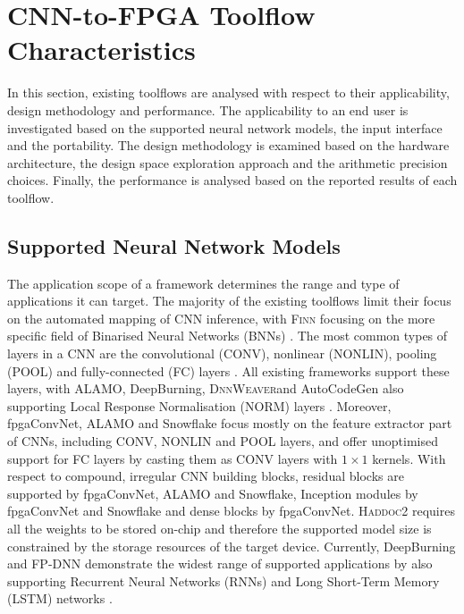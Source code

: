 \documentclass[format=acmsmall, review=false, screen=true]{acmart}
\begin{document}
\section{CNN-to-FPGA Toolflow Characteristics}\label{sec2}

In this section, existing toolflows are analysed with respect to their applicability, design methodology and performance. The applicability to an end user is investigated based on the supported neural network models, the input interface and the portability. The design methodology is examined based on the hardware architecture, the design space exploration approach and the arithmetic precision choices. Finally, the performance is analysed based on the reported results of each toolflow.

\subsection{Supported Neural Network Models}\label{sec3}
The application scope of a framework determines the range and type of applications it can target. The majority of the existing toolflows limit their focus on the automated mapping of CNN inference, with
\textsc{Finn} focusing on the more specific field of Binarised Neural Networks (BNNs) \cite{NIPS2016_bnns}. The most common types of layers in a CNN are the convolutional (CONV), nonlinear (NONLIN), pooling (POOL) and fully-connected (FC) layers \cite{Lecun1998}. All existing frameworks support these layers, with ALAMO, DeepBurning, \textsc{DnnWeaver}{\color{black}and AutoCodeGen}  also supporting Local Response Normalisation (NORM) layers \cite{Krizhevsky2012}. Moreover, fpgaConvNet, {\color{black}ALAMO and Snowflake} focus mostly on the feature extractor part of CNNs, including CONV, NONLIN and POOL layers, and offer {\color{black}unoptimised support for FC layers by casting them as CONV layers with $1 \times 1$ kernels. With respect to compound, irregular CNN building blocks, residual blocks \cite{He_2016} are supported by fpgaConvNet, ALAMO and Snowflake, Inception modules \cite{Szegedy2014}\cite{Szegedy_2016} by fpgaConvNet and Snowflake and dense blocks \cite{huang2017densely} by fpgaConvNet.} {\color{black}\textsc{Haddoc2} requires all the weights to be stored on-chip and therefore the supported model size is constrained by the storage resources of the target device.} Currently, DeepBurning and FP-DNN demonstrate the widest range of supported applications by also supporting Recurrent Neural Networks (RNNs) and Long Short-Term Memory (LSTM) networks \cite{lstm1997}.
\end{document}
